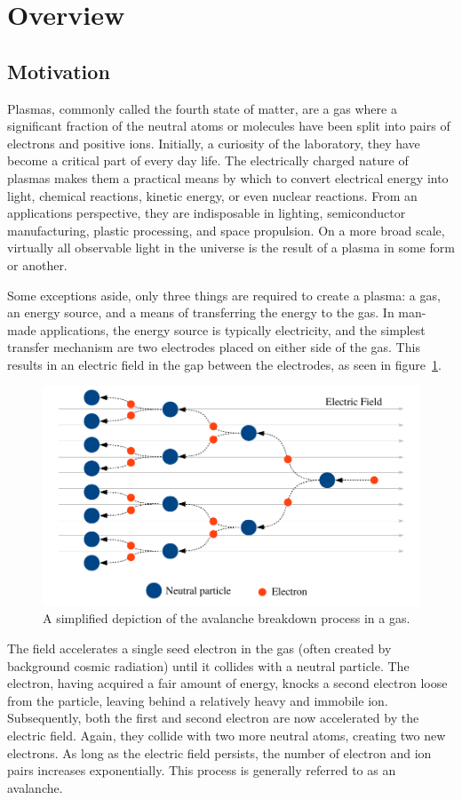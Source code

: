 \section{Overview}

\subsection{Motivation}
Plasmas, commonly called the fourth state of matter, are a gas where a
significant fraction of the neutral atoms or molecules have been split into
pairs of electrons and positive ions. Initially, a curiosity of the laboratory,
they have become a critical part of every day life. The electrically charged
nature of plasmas makes them a practical means by which to convert electrical
energy into light, chemical reactions, kinetic energy, or even nuclear
reactions. From an applications perspective, they are indisposable in lighting,
semiconductor manufacturing, plastic processing, and space propulsion. On a more
broad scale, virtually all observable light in the universe is the result of a
plasma in some form or another.

Some exceptions aside, only three things are required to create a plasma: a gas,
an energy source, and a means of transferring the energy to the gas. In man-made
applications, the energy source is typically electricity, and the simplest
transfer mechanism are two electrodes placed on either side of the gas. This
results in an electric field in the gap between the electrodes, as seen in
figure~\ref{fig:avalanche}.
\begin{figure}
  \centering
  \includegraphics{./chapters/introduction/figures/avalanche.pdf}
  \caption{A simplified depiction of the avalanche breakdown process in a gas.}
  \label{fig:avalanche}
\end{figure}
The field accelerates a single seed electron in the gas (often created by
background cosmic radiation) until it collides with a neutral particle. The
electron, having acquired a fair amount of energy, knocks a second electron
loose from the particle, leaving behind a relatively heavy and immobile ion.
Subsequently, both the first and second electron are now accelerated by the
electric field. Again, they collide with two more neutral atoms, creating two
new electrons. As long as the electric field persists, the number of electron
and ion pairs increases exponentially. This process is generally referred to as
an avalanche.

